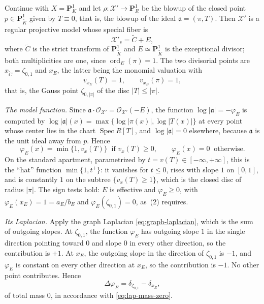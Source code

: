 \begin{example}
\label{ex:metrics-p1-blowup}
Continue with $X=\mathbf P^1_K$ and let
$\rho:\mathcal X'\to\mathbf P^1_R$ be the blowup of the closed point
$p\in\mathbf P^1_{\widetilde K}$ given by $T\equiv0$, that is, the
blowup of the ideal $\mathfrak a=(\pi,T)$. Then $\mathcal X'$ is a
regular projective model whose special fiber is
\[
 \mathcal X'_s=\widetilde C+E,
\]
where $\widetilde C$ is the strict transform of
$\mathbf P^1_{\widetilde K}$ and $E\simeq\mathbf P^1_{\widetilde K}$ is
the exceptional divisor; both multiplicities are one, since
$\operatorname{ord}_E(\pi)=1$. The two divisorial points are
$x_{\widetilde C}=\zeta_{0,1}$ and $x_E$, the latter being the monomial
valuation with
\[
 v_{x_E}(T)=1,\qquad v_{x_E}(\pi)=1,
\]
that is, the Gauss point $\zeta_{0,|\pi|}$ of the disc $|T|\le|\pi|$.

\emph{The model function.} Since $\mathfrak a\cdot\mathcal O_{\mathcal X'}
=\mathcal O_{\mathcal X'}(-E)$, the function
$\log|\mathfrak a|=-\varphi_E$ is computed by
$\log|\mathfrak a|(x)=\max\{\log|\pi(x)|,\log|T(x)|\}$ at every point
whose center lies in the chart $\operatorname{Spec}R[T]$, and
$\log|\mathfrak a|=0$ elsewhere, because $\mathfrak a$ is the unit ideal
away from $p$. Hence
\begin{equation}
\label{eq:metrics-p1-blowup-hat}
 \varphi_E(x)=\min\{1,v_x(T)\}\ \text{ if }v_x(T)\ge0,
 \qquad
 \varphi_E(x)=0\ \text{ otherwise.}
\end{equation}
On the standard apartment, parametrized by $t=v(T)\in[-\infty,+\infty]$,
this is the ``hat'' function $\min\{1,t^+\}$: it vanishes for $t\le0$,
rises with slope $1$ on $[0,1]$, and is constantly $1$ on the subtree
$\{v_x(T)\ge1\}$, which is the closed disc of radius $|\pi|$. The sign
tests hold: $E$ is effective and $\varphi_E\ge0$, with
$\varphi_E(x_E)=1=a_E/b_E$ and $\varphi_E(\zeta_{0,1})=0$, as
\,(2) requires.

\emph{Its Laplacian.} Apply the graph Laplacian
\eqref{eq:graph-laplacian}, which is the sum of outgoing slopes. At
$\zeta_{0,1}$, the function $\varphi_E$ has outgoing slope $1$ in the
single direction pointing toward $0$ and slope $0$ in every other
direction, so the contribution is $+1$. At $x_E$, the outgoing slope in
the direction of $\zeta_{0,1}$ is $-1$, and $\varphi_E$ is constant on
every other direction at $x_E$, so the contribution is $-1$. No other
point contributes. Hence
\begin{equation}
\label{eq:metrics-p1-blowup-laplacian}
 \Delta\varphi_E=\delta_{\zeta_{0,1}}-\delta_{x_E},
\end{equation}
of total mass $0$, in accordance with \eqref{eq:lap-mass-zero}.


\end{example}
